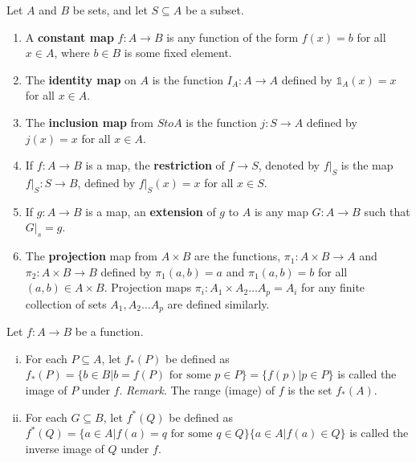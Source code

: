 \documentclass[a4paper,english,12pt]{article}
\begin{document}
\begin{defn}
Let $A$ and $B$ be sets, and let $S \subseteq A$ be a subset. 
\begin{enumerate}
 \item  A \textbf{constant map} $f: A \to B$ is any function of the form $f(x) = b$ for all $x \in A$, where $b \in B$ is some fixed element.
 
 \item  The \textbf{identity map} on $A$ is the function $I_{A}: A \to A$ defined by $\mathbb{1}_{A}(x) = x$ for all $x \in A$.

 \item  The \textbf{inclusion map} from $S to A$ is the function $j: S \to A$ defined by $j(x) = x$ for all $x \in A$.

 \item If $f: A \to B$ is a map, the \textbf{restriction} of $f \to S$, denoted by $f |_{S}$ is the map $f|_{S}: S \to B$, defined by $f|_{S}(x)= x$ for all 
 $x \in S$.

 \item  If $g: A \to B$ is a map, an \textbf{extension} of $g$ to $A$ is any map $G: A \to B$ such that $G|_{s} = g$.

 \item   The \textbf{projection} map from $A \times B$ are the functions, $\pi_{1}: A \times B \to A$ and $\pi_{2}: A \times B \to B$ defined by 
 $\pi_{1}(a, b) = a$ and $\pi_{1}(a, b) = b$ for all $(a,b) \in A \times B$. Projection maps $\pi_{i}: A_{1} \times A_{2} \dots A_{p} = A_{i}$ for 
 any finite collection of sets $A_{1}, A_{2} \dots A_{p}$ are defined similarly.

\end{enumerate}
\end{defn}


\begin{defn} 
 Let $f: A \to B$ be a function.
 \begin{enumerate} [i)]
  \item For each $P \subseteq A$, let $f_{*}(P)$ be defined as $f_{*}(P) = \{ b \in B | b = f(P) \text{ for some } p \in P \} = \{ f(p) | p \in P\}$ is called 
  the image of $P$ under $f$.
  \emph{Remark}. The range (image) of $f$ is the set $f_{*}(A)$.
  \item For each $G \subseteq B$, let $f^{*}(Q)$ be defined as $f^{*}(Q) = \{ a \in A | f(a) = q \text{ for some } q \in Q\} \{ a \in A | f(a) \in Q \}$ is called 
  the inverse image of $Q$ under $f$.
 \end{enumerate}
\end{defn}
\end{document}
